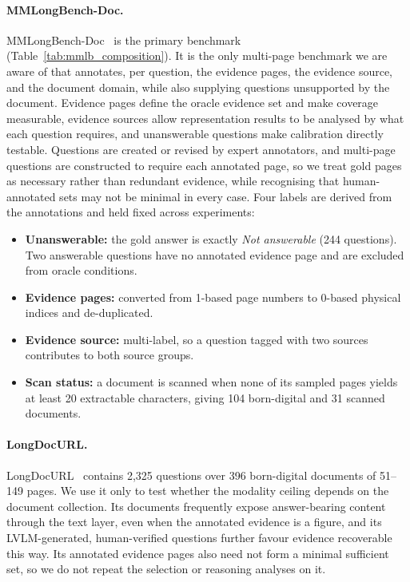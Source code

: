 \paragraph{MMLongBench-Doc.}
\label{sec:emp_mmlongbench}
MMLongBench-Doc~\citep{ma2024mmlongbench} is the primary benchmark (Table~\ref{tab:mmlb_composition}). It is the only multi-page benchmark we are aware of that annotates, per question, the evidence pages, the evidence source, and the document domain, while also supplying questions unsupported by the document. Evidence pages define the oracle evidence set and make coverage measurable, evidence sources allow representation results to be analysed by what each question requires, and unanswerable questions make calibration directly testable. Questions are created or revised by expert annotators, and multi-page questions are constructed to require each annotated page, so we treat gold pages as necessary rather than redundant evidence, while recognising that human-annotated sets may not be minimal in every case. Four labels are derived from the annotations and held fixed across experiments:
\begin{itemize}
\item \textbf{Unanswerable:} the gold answer is exactly \emph{Not answerable} (244 questions). Two answerable questions have no annotated evidence page and are excluded from oracle conditions.
\item \textbf{Evidence pages:} converted from 1-based page numbers to 0-based physical indices and de-duplicated.
\item \textbf{Evidence source:} multi-label, so a question tagged with two sources contributes to both source groups.
\item \textbf{Scan status:} a document is scanned when none of its sampled pages yields at least 20 extractable characters, giving 104 born-digital and 31 scanned documents.
\end{itemize}



\paragraph{LongDocURL.}
\label{sec:emp_longdocurl}
LongDocURL~\citep{deng2025longdocurl} contains 2,325 questions over 396 born-digital documents of 51--149 pages. We use it only to test whether the modality ceiling depends on the document collection. Its documents frequently expose answer-bearing content through the text layer, even when the annotated evidence is a figure, and its LVLM-generated, human-verified questions further favour evidence recoverable this way. Its annotated evidence pages also need not form a minimal sufficient set, so we do not repeat the selection or reasoning analyses on it.

